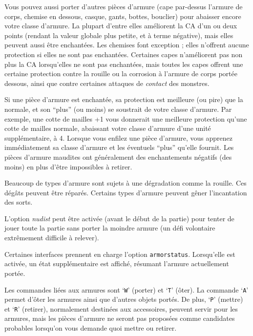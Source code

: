 \documentclass[titlepage]{article}
\begin{document}
\noindent Vous pouvez aussi porter d'autres pièces d'armure (cape par-dessus l'armure de
corps, chemise en dessous, casque, gants, bottes, bouclier) pour abaisser encore
votre classe d'armure.
La plupart d'entre elles améliorent la CA d'un ou deux points (rendant la
valeur globale plus petite, et à terme négative), mais elles peuvent aussi être
enchantées.
Les chemises font exception ; elles n'offrent aucune protection si elles ne sont pas enchantées.
Certaines capes n'améliorent pas non plus la CA lorsqu'elles ne sont pas enchantées, mais toutes
les capes offrent une certaine protection contre la rouille ou la corrosion à l'armure
de corps portée dessous, ainsi que contre certaines attaques de \textit{contact} des monstres.

Si une pièce d'armure est enchantée, sa protection est meilleure
(ou pire) que la normale, et son ``plus'' (ou moins) se soustrait de
votre classe d'armure.  Par exemple, une cotte de mailles +1 vous donnerait
une meilleure protection qu'une cotte de mailles normale, abaissant votre classe
d'armure d'une unité supplémentaire, à 4.  Lorsque vous enfilez une pièce d'armure,
vous apprenez immédiatement sa classe d'armure et les éventuels ``plus'' qu'elle fournit.
Les pièces d'armure maudites ont généralement des enchantements négatifs (des moins)
en plus d'être impossibles à retirer.

Beaucoup de types d'armure sont sujets à une dégradation comme la rouille.  Ces
dégâts peuvent être réparés.  Certains types d'armure peuvent gêner l'incantation des sorts.

L'option \textit{nudist}
peut être activée (avant le début de la partie) pour tenter de jouer toute la
partie sans porter la moindre armure (un défi volontaire
extrêmement difficile à relever).

Certaines interfaces prennent en charge l'option \texttt{armorstatus}.
Lorsqu'elle est activée, un état supplémentaire est affiché, résumant
l'armure actuellement portée.

Les commandes liées aux armures sont `\texttt{W}' (porter) et `\texttt{T}' (ôter).
La commande `\texttt{A}' permet d'ôter les armures ainsi que d'autres
objets portés.
De plus, `\texttt{P}' (mettre) et `\texttt{R}' (retirer), normalement destinées aux
accessoires, peuvent servir pour les armures, mais les pièces d'armure ne seront pas
proposées comme candidates probables lorsqu'on vous demande quoi mettre ou retirer.
\end{document}
